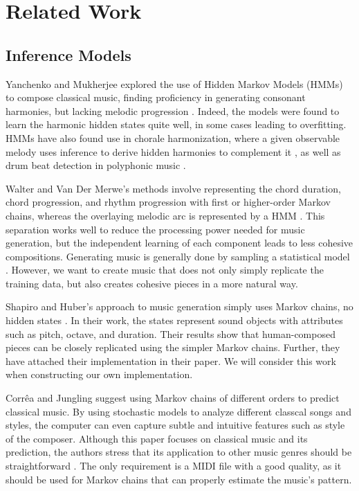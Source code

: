 \documentclass{article}
\begin{document}
\section{Related Work}
\subsection{Inference Models}
Yanchenko and Mukherjee explored the use of Hidden Markov Models (HMMs) to compose classical music, finding proficiency in generating consonant harmonies, but 
lacking melodic progression \cite{yanchenko_2017}. Indeed, the models were found to learn the harmonic hidden states quite well, in some cases leading to overfitting. 
HMMs have also found use in chorale harmonization, where a given observable melody uses inference to derive hidden harmonies to complement it \cite{allan_2005}, as well 
as drum beat detection in polyphonic music \cite{drum_detection}. 

Walter and Van Der Merwe's methods involve representing the chord duration, chord progression, and rhythm progression with first or higher-order Markov chains, whereas 
the overlaying melodic arc is represented by a HMM \cite{walter_2011}. This separation works well to reduce the processing power needed for music generation, but the 
independent learning of each component leads to less cohesive compositions. Generating music is generally done by sampling a statistical model \cite{conklin_2003}.
However, we want to create music that does not only simply replicate the training data, but also creates cohesive pieces in a more natural way. 

Shapiro and Huber's approach to music generation simply uses Markov chains, no hidden states \cite{shapiro_huber_2021}. In their work, the states represent sound 
objects with attributes such as pitch, octave, and duration. Their results show that human-composed pieces can be closely replicated using the simpler Markov chains. 
Further, they have attached their implementation in their paper. We will consider this work when constructing our own implementation.

Corrêa and Jungling suggest using Markov chains of different orders to predict classical music. By using stochastic models to analyze different classcal songs and styles,
the computer can even capture subtle and intuitive features such as style of the composer. Although this paper focuses on classical music and its prediction, the authors 
stress that its application to other music genres should be straightforward \cite{correa_jungling_small_2020}. 
The only requirement is a MIDI file with a good quality, as it should be used for Markov chains that can properly estimate the music's pattern.
\end{document}
